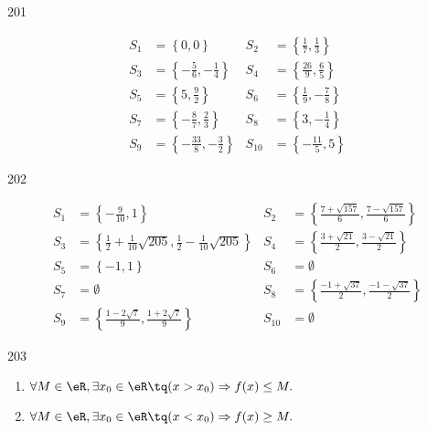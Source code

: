 \documentclass{article}
\begin{document}
  \begin{corrige}{201}

\begin{align*}
S_{1}&=\left\{0,0\right\}&S_{2}&=\left\{\frac{1}{7},\frac{1}{3}\right\}\\
S_{3}&=\left\{-\frac{5}{6},-\frac{1}{4}\right\}&S_{4}&=\left\{\frac{26}{9},\frac{6}{5}\right\}\\
S_{5}&=\left\{5,\frac{9}{2}\right\}&S_{6}&=\left\{\frac{1}{9},-\frac{7}{8}\right\}\\
S_{7}&=\left\{-\frac{8}{7},\frac{2}{3}\right\}&S_{8}&=\left\{3,-\frac{1}{4}\right\}\\
S_{9}&=\left\{-\frac{33}{8},-\frac{3}{2}\right\}&S_{10}&=\left\{-\frac{11}{5},5\right\}
\end{align*}
 \end{corrige}%



  \begin{corrige}{202}

\begin{align*}
S_{1}&=\left\{-\frac{9}{10},1\right\}&S_{2}&=\left\{\frac{7+\sqrt{157}}{6},\frac{7-\sqrt{157}}{6}\right\}\\
S_{3}&=\left\{\frac{1}{2}+\frac{1}{10}\sqrt{205},\frac{1}{2}-\frac{1}{10}\sqrt{205}\right\}&S_{4}&=\left\{\frac{3+\sqrt{21}}{2},\frac{3-\sqrt{21}}{2}\right\}\\
S_{5}&=\left\{-1,1\right\}&S_{6}&=\emptyset\\
S_{7}&=\emptyset&S_{8}&=\left\{\frac{-1+\sqrt{37}}{2},\frac{-1-\sqrt{37}}{2}\right\}\\
S_{9}&=\left\{\frac{1-2\sqrt{7}}{9},\frac{1+2\sqrt{7}}{9}\right\}&S_{10}&=\emptyset
\end{align*}
 \end{corrige}%


\begin{corrige}{203}
\begin{enumerate}
\item $\forall M\in\eR,\exists x_0\in\eR\tq (x>x_0)\Rightarrow f(x)\leq M.$
\item $\forall M\in\eR,\exists x_0\in\eR\tq (x<x_0)\Rightarrow f(x)\geq M.$
\end{enumerate}
\end{corrige}
\end{document}
